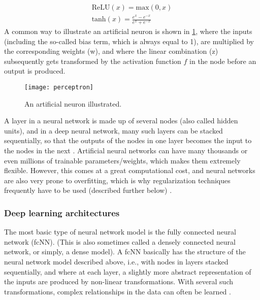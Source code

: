 \begin{gather}
    \text{ReLU}(x) = \text{max}(0,x) \label{eq:relu} \\[1ex]
    \text{tanh}(x) = \frac{e^x - e^{-x}}{e^x + e^{-x}} \label{eq:tanh}
\end{gather}
\noindent
A common way to illustrate an artificial neuron is shown in \cref{fig:perceptron}, where the inputs (including the so-called bias term, which is always equal to 1), are multiplied by the corresponding weights (w), and where the linear combination (z) subsequently gets transformed by the activation function $f$ in the node before an output is produced.
\begin{figure}[h]
\begin{center}
\texttt{[image: perceptron]}
\caption{An artificial neuron illustrated.}
\label{fig:perceptron}
\end{center}
\end{figure}

A layer in a neural network is made up of several nodes (also called hidden units), and in a deep neural network, many such layers can be stacked sequentially, so that the outputs of the nodes in one layer becomes the input to the nodes in the next \cite{smlbook}. Artificial neural networks can have many thousands or even millions of trainable parameters/weights, which makes them extremely flexible. However, this comes at a great computational cost, and neural networks are also very prone to overfitting, which is why regularization techniques frequently have to be used (described further below) \cite{smlbook}. 

\subsubsection{Deep learning architectures}
\label{sec:DL models}
The most basic type of neural network model is the fully connected neural network (fcNN). (This is also sometimes called a densely connected neural network, or simply, a dense model). A fcNN basically has the structure of the neural network model described above, i.e., with nodes in layers stacked sequentially, and where at each layer, a slightly more abstract representation of the inputs are produced by non-linear transformations. With several such transformations, complex relationships in the data can often be learned \cite{LeCun2015, smlbook}.


